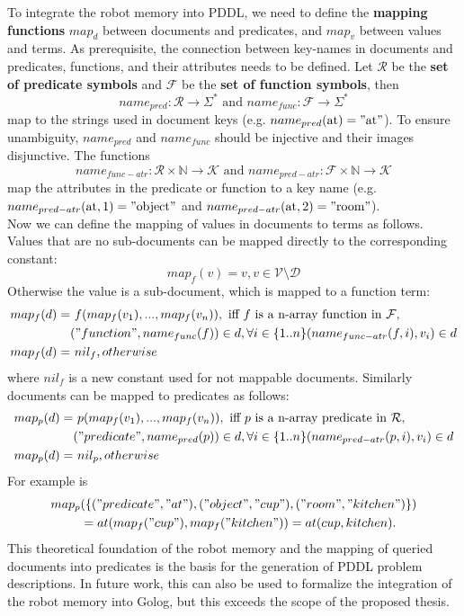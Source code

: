 \documentclass[a4paper,11pt]{article}
\begin{document}
To integrate the robot memory into PDDL, we need to define the
\textbf{mapping functions} $map_d$ between documents and predicates, and
$map_v$ between values and terms. As prerequisite, the connection
between key-names in documents and predicates, functions, and their
attributes needs to be defined. Let $\mathcal{R}$ be the \textbf{set
  of predicate symbols} and $\mathcal{F}$ be the \textbf{set of function
  symbols}, then
%
$$name_{pred}: \mathcal{R} \rightarrow \Sigma^*
\text{ and } name_{func}: \mathcal{F} \rightarrow \Sigma^*$$
%
map to the strings used in document keys
(e.g. $name_{pred}(\text{at})="\text{at}"$). To ensure unambiguity,
$name_{pred}$ and $name_{func}$ should
be injective and their images disjunctive. The functions
%
$$ name_{func-atr}: \mathcal{R} \times \mathbb{N} \rightarrow
\mathcal{K} \text{ and } name_{pred-atr}: \mathcal{F} \times \mathbb{N}
\rightarrow \mathcal{K}$$
%
map the attributes in the predicate or function to a key
name (e.g. $name_{pred-atr}(\text{at},1)="\text{object}"$ and
$name_{pred-atr}(\text{at},2)="\text{room}"$).
\\
Now we can define the mapping of values in documents to terms as
follows. Values that are no sub-documents can be mapped directly to
the corresponding constant:
$$map_f(v)=v, v \in \mathcal{V} \setminus \mathcal{D}$$
Otherwise the value is a sub-document, which is mapped to a function term:
\begin{align*}
  map_f(d)= &\text{ }f(map_f(v_1), ..., map_f(v_n)), \text{ iff } f \text{ is a n-array function in } \mathcal{F},\\
  &("function", name_{func}(f))\in d,
  \forall i \in \{1..n\} (name_{func-atr}(f,i), v_i)\in d\\
  map_f(d)= &\text{ } nil_f, otherwise\text{~~~~~~~~~~~~~~~}
\end{align*}
where $nil_f$ is a new constant used for not mappable documents.
Similarly documents can be mapped to predicates as follows:
\begin{align*}
  map_p(d)=&\text{ }p(map_f(v_1), ..., map_f(v_n)), \text{ iff } p \text{ is a n-array predicate in } \mathcal{R},\\
  &("predicate", name_{pred}(p))\in d,
  \forall i \in \{1..n\} (name_{pred-atr}(p,i), v_i)\in d\\
  map_p(d)=& \text{ }nil_p, otherwise\text{~~~~~~~~~~~~~~~}
\end{align*}
For example is
\begin{align*}
map_p&(\{("predicate", "at"),("object", "cup"),("room",
"kitchen")\})\\
&= at(map_f("cup"), map_f("kitchen")) = at(cup, kitchen) \text{.}
\end{align*}
This theoretical foundation of the robot memory and the mapping of
queried documents into predicates is the basis for the generation of
PDDL problem descriptions. In future work, this can also be used to
formalize the integration of the robot memory into Golog, but this
exceeds the scope of the proposed thesis.
\end{document}
